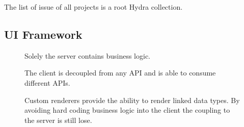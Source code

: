 The list of issue of all projects is a root Hydra collection.


\subsection{UI Framework}

\begin{figure}[!htb]
  \caption{Solely the server contains business logic.}
\end{figure}

\begin{figure}[!htb]
  \caption{The client is decoupled from any API and is able to consume different APIs.}
\end{figure}

\begin{figure}[!htb]
  \caption{Custom renderers provide the ability to render linked data types. By avoiding hard coding business logic into the client the coupling to the server is still lose.}
\end{figure}
